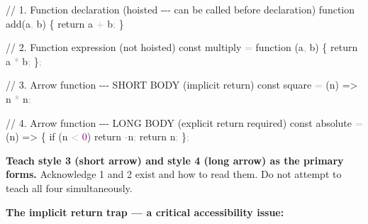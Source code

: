 \documentclass[
  justified,
  openright,
]{tufte-book}
\newcommand{\CommentTok}[1]{\textcolor{MidGray}{#1}}
\newcommand{\ControlFlowTok}[1]{\textcolor{BrandBlue}{#1}}
\newcommand{\DecValTok}[1]{\textcolor{Purple}{#1}}
\newcommand{\FunctionTok}[1]{\textcolor{BrandBlue}{#1}}
\newcommand{\KeywordTok}[1]{\textcolor{BrandBlue}{#1}}
\newcommand{\NormalTok}[1]{#1}
\newcommand{\OperatorTok}[1]{\textcolor{DarkGray}{#1}}
\newenvironment{Shaded}{%
  \begin{snugshade}
}{%
  \end{snugshade}
}
\begin{document}
\begin{Shaded}
\begin{Highlighting}[]
\CommentTok{// 1. Function declaration (hoisted {-}{-}{-} can be called before declaration)}
\KeywordTok{function} \FunctionTok{add}\NormalTok{(a}\OperatorTok{,}\NormalTok{ b) \{}
  \ControlFlowTok{return}\NormalTok{ a }\OperatorTok{+}\NormalTok{ b}\OperatorTok{;}
\NormalTok{\}}

\CommentTok{// 2. Function expression (not hoisted)}
\KeywordTok{const}\NormalTok{ multiply }\OperatorTok{=} \KeywordTok{function}\NormalTok{ (a}\OperatorTok{,}\NormalTok{ b) \{}
  \ControlFlowTok{return}\NormalTok{ a }\OperatorTok{*}\NormalTok{ b}\OperatorTok{;}
\NormalTok{\}}\OperatorTok{;}

\CommentTok{// 3. Arrow function {-}{-}{-} SHORT BODY (implicit return)}
\KeywordTok{const}\NormalTok{ square }\OperatorTok{=}\NormalTok{ (n) }\KeywordTok{=\textgreater{}}\NormalTok{ n }\OperatorTok{*}\NormalTok{ n}\OperatorTok{;}

\CommentTok{// 4. Arrow function {-}{-}{-} LONG BODY (explicit return required)}
\KeywordTok{const}\NormalTok{ absolute }\OperatorTok{=}\NormalTok{ (n) }\KeywordTok{=\textgreater{}}\NormalTok{ \{}
  \ControlFlowTok{if}\NormalTok{ (n }\OperatorTok{\textless{}} \DecValTok{0}\NormalTok{) }\ControlFlowTok{return} \OperatorTok{{-}}\NormalTok{n}\OperatorTok{;}
  \ControlFlowTok{return}\NormalTok{ n}\OperatorTok{;}
\NormalTok{\}}\OperatorTok{;}
\end{Highlighting}
\end{Shaded}

\textbf{Teach style 3 (short arrow) and style 4 (long arrow) as the
primary forms.} Acknowledge 1 and 2 exist and how to read them. Do not
attempt to teach all four simultaneously.

\textbf{The implicit return trap --- a critical accessibility issue:}
\end{document}

